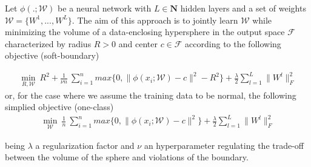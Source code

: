 \documentclass{article}
\begin{document}
\begin{itemize}
	Let $\phi(.; \mathcal{W})$ be a neural network with $L \in \mathbf{N}$ hidden layers and a set of weights $\mathcal{W} = \{ W^1, ..., W^L\}$. The aim of this approach is to jointly learn $\mathcal{W}$ while minimizing the volume of a data-enclosing hypersphere in the output space $\mathcal{F}$ characterized by radius $R > 0$ and center $c \in \mathcal{F}$ according to the following objective (soft-boundary)
    
    \begin{align*}
	    \min_{R, \mathcal{W}} \ R^2 + \frac{1}{\nu n} \ \sum_{i=1}^{n} max \{0, \|\phi(x_i; \mathcal{W}) - c \|^2 - R^2\} + \frac{\lambda}{2} \sum_{l=1}^{L} \|W^{l}\|^2_F
	\end{align*}
	or, for the case where we assume the training data to be normal, the following simplied objective (one-class)
	  \begin{align*}
	    \min_{\mathcal{W}} \ \frac{1}{n} \ \sum_{i=1}^{n} max \{0, \|\phi(x_i; \mathcal{W}) - c \|^2\} + \frac{\lambda}{2} \sum_{l=1}^{L} \|W^{l}\|^2_F
	\end{align*}
	
	being $\lambda$ a regularization factor and $\nu$ an hyperparameter regulating the trade-off between the volume of the sphere and violations of the boundary. 

\end{itemize}
\end{document}
